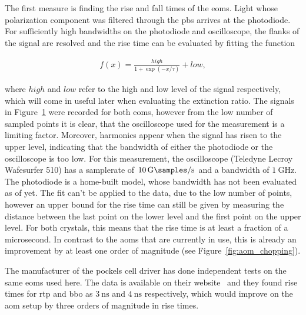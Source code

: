 The first measure is finding the rise and fall times of the \acp{eom}. Light whose polarization component was filtered through the \ac{pbs} arrives at the photodiode. For sufficiently high bandwidths on the photodiode and oscilloscope, the flanks of the signal are resolved and the rise time can be evaluated by fitting the function

\begin{align}
	f(x) = \frac{high}{1 + \exp{(-x/\tau)}} + low,
\end{align}

where $high$ and $low$ refer to the high and low level of the signal respectively, which will come in useful later when evaluating the extinction ratio. The signals in Figure~\ref{fig:eom_rise} were recorded for both \acp{eom}, however from the low number of sampled points it is clear, that the oscilloscope used for the measurement is a limiting factor. Moreover, harmonics appear when the signal has risen to the upper level, indicating that the bandwidth of either the photodiode or the oscilloscope is too low. For this measurement, the oscilloscope (Teledyne Lecroy Wafesurfer 510) has a samplerate of $\SI{10}{\giga\samples\per\second}$ and a bandwidth of $\SI{1}{\giga\hertz}$. The photodiode is a home-built model, whose bandwidth has not been evaluated as of yet. The fit can't be applied to the data, due to the low number of points, however an upper bound for the rise time can still be given by measuring the distance between the last point on the lower level and the first point on the upper level. For both crystals, this means that the rise time is at least a fraction of a microsecond. In contrast to the \acp{aom} that are currently in use, this is already an improvement by at least one order of magnitude (see Figure~\ref{fig:aom_chopping}).

The manufacturer of the pockels cell driver has done independent tests on the same \acp{eom} used here. The data is available on their website~\cite{Bergmann2020} and they found rise times for \ac{rtp} and \ac{bbo} as $\SI{3}{\nano\second}$ and $\SI{4}{\nano\second}$ respectively, which would improve on the \ac{aom} setup by three orders of magnitude in rise times.
\begin{figure}[t]%
\label{fig:eom_rise}
\end{figure}

